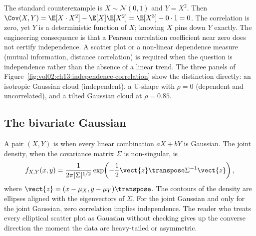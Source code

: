 The standard counterexample is $X \sim \mathcal{N}(0, 1)$ and
$Y = X^{2}$. Then $\Cov(X, Y) = \E[X \cdot X^{2}] - \E[X] \E[X^{2}]
= \E[X^{3}] - 0 \cdot 1 = 0$. The correlation is zero, yet $Y$ is a
deterministic function of $X$; knowing $X$ pins down $Y$ exactly.
The engineering consequence is that a Pearson correlation
coefficient near zero does not certify independence. A scatter plot
or a non-linear dependence measure (mutual information, distance
correlation) is required when the question is independence rather
than the absence of a linear trend. The three panels of
Figure~\ref{fig:vol02:ch13:independence-correlation} show the
distinction directly: an isotropic Gaussian cloud (independent),
a U-shape with $\rho = 0$ (dependent and uncorrelated), and a
tilted Gaussian cloud at $\rho = 0.85$.



\subsection{The bivariate Gaussian}

A pair $(X, Y)$ is  when every linear
combination $aX + bY$ is Gaussian. The joint density, when the
covariance matrix $\Sigma$ is non-singular, is
\[
f_{X, Y}(x, y) = \frac{1}{2\pi |\Sigma|^{1/2}}
\exp\!\left(-\frac{1}{2} \vect{z}\transpose \Sigma^{-1} \vect{z}\right),
\]
where $\vect{z} = (x - \mu_{X}, y - \mu_{Y})\transpose$. The
contours of the density are ellipses aligned with the eigenvectors
of $\Sigma$. For the joint Gaussian and only for the joint
Gaussian, zero correlation implies independence. The reader who
treats every elliptical scatter plot as Gaussian without checking
gives up the converse direction the moment the data are heavy-tailed
or asymmetric.


